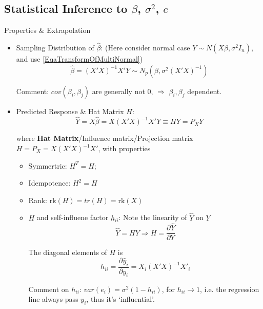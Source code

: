 \subsection{Statistical Inference to $ \beta  $, $ \sigma ^2 $, $ e $}\label{SubSubSectionStatisticalInferenceInMultiLRA}
    Properties \& Extrapolation
\begin{itemize}[topsep=2pt,itemsep=2pt]
    \item Sampling Distribution of $ \hat{\beta } $: (Here consider normal case $ Y\sim N(X\beta ,\sigma^2I_n) $, and use \autoref{EqaTransformOfMultiNormal}) 
    \begin{equation}\label{EqaDistributionOfMultiVariateBeta}
        \hat{\beta }=(X'X)^{-1}X'Y \sim N_p(\beta,\sigma^2(X'X)^{-1})
    \end{equation}

    Comment: $ cov(\beta_i,\beta_j ) $ are generally not 0, $ \Rightarrow $ $ \beta _i,\beta _j $ dependent.
    \item Predicted Response \& Hat Matrix $ H $:
    \begin{equation}
        \hat{Y}=X\hat{\beta }=X(X'X)^{-1}X'Y\equiv  HY=P_XY
    \end{equation}

    where \textbf{Hat Matrix}/Influence matrix/Projection matrix $ H=P_X=X(X'X)^{-1}X' $, with properties
    \begin{itemize}[topsep=2pt,itemsep=2pt]
        \item Symmertric: $ H^T=H $;
        \item Idempotence: $ H^2=H $
        \item Rank: $ \mathrm{rk}(H)=tr(H)=\mathrm{rk}(X)   $
        \item $ H $ and self-influene factor $ h_{ii} $: Note the linearity of $ \hat{Y} $ on $ Y $
        \begin{equation}
            \hat{Y}=HY \Rightarrow H=\dfrac{\partial^{} \hat{Y}}{\partial Y^{}}
        \end{equation} 
    
        The diagonal elements of $ H $ is 
        \begin{equation}
            h_{ii}=\dfrac{\partial^{}\hat{y}_i}{\partial y_i^{}}=X_i(X'X)^{-1}X'_i
        \end{equation}

        Comment on $ h_{ii} $: $ var(e_i) =\sigma ^2(1-h_{ii})$, for $ h_{ii}\to 1 $, i.e. the regression line always pass $ y_i $, thus it's `influential'.
    \end{itemize}


\end{itemize}
